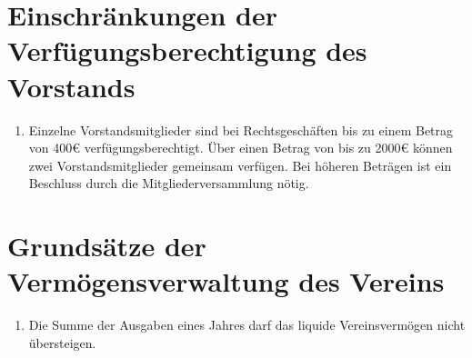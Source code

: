\documentclass[fontsize=12pt,paper=a4,pagesize,headings=small]{scrartcl}
\begin{document}
\section{Einschränkungen der Verfügungsberechtigung des Vorstands}
\begin{enumerate}
    \item Einzelne Vorstandsmitglieder sind bei Rechtsgeschäften bis zu
        einem Betrag von 400\euro{} verfügungsberechtigt. Über einen Betrag
        von bis zu 2000\euro{} können zwei Vorstandsmitglieder gemeinsam
        verfügen. Bei höheren Beträgen ist ein Beschluss durch die
        Mitgliederversammlung nötig.
\end{enumerate}


\section{Grundsätze der Vermögensverwaltung des Vereins}
\begin{enumerate}
    \item Die Summe der Ausgaben eines Jahres darf das liquide
            Vereinsvermögen nicht übersteigen.
\end{enumerate}
\end{document}
